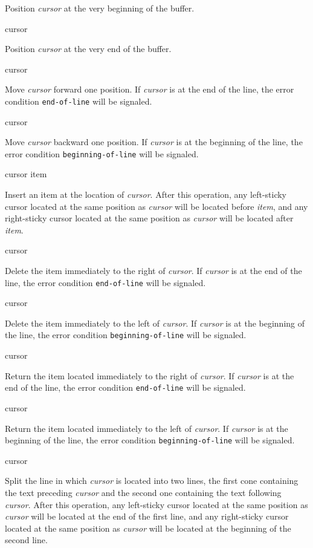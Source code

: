 Position \textit{cursor} at the very beginning of the buffer.

 {cursor}

Position \textit{cursor} at the very end of the buffer.

 {cursor}

Move \textit{cursor} forward one position.  If \emph{cursor} is at the
end of the line, the error condition \texttt{end-of-line} will be
signaled.

 {cursor}

Move \textit{cursor} backward one position.  If \emph{cursor} is at
the beginning of the line, the error condition
\texttt{beginning-of-line} will be signaled.

 {cursor item}

Insert an item at the location of \textit{cursor}.  After this
operation, any left-sticky cursor located at the same position as
\textit{cursor} will be located before \textit{item}, and any
right-sticky cursor located at the same position as \textit{cursor}
will be located after \textit{item}.

 {cursor}

Delete the item immediately to the right of \emph{cursor}.  If
\emph{cursor} is at the end of the line, the error condition
\texttt{end-of-line} will be signaled.

 {cursor}

Delete the item immediately to the left of \emph{cursor}.  If
\emph{cursor} is at the beginning of the line, the error condition
\texttt{beginning-of-line} will be signaled.

 {cursor}

Return the item located immediately to the right of \textit{cursor}.
If \emph{cursor} is at the end of the line, the error condition
\texttt{end-of-line} will be signaled.

 {cursor}

Return the item located immediately to the left of \textit{cursor}.
If \emph{cursor} is at the beginning of the line, the error condition
\texttt{beginning-of-line} will be signaled.

 {cursor}

Split the line in which \textit{cursor} is located into two lines, the
first cone containing the text preceding \textit{cursor} and the
second one containing the text following \textit{cursor}.  After this
operation, any left-sticky cursor located at the same position as
\textit{cursor} will be located at the end of the first line, and any
right-sticky cursor located at the same position as \textit{cursor}
will be located at the beginning of the second line.


